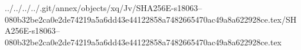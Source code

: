 ../../../../.git/annex/objects/xq/Jv/SHA256E-s18063--080b32be2ca0e2de74219a5a6dd43e44122858a7482665470ac49a8a622928ce.tex/SHA256E-s18063--080b32be2ca0e2de74219a5a6dd43e44122858a7482665470ac49a8a622928ce.tex
